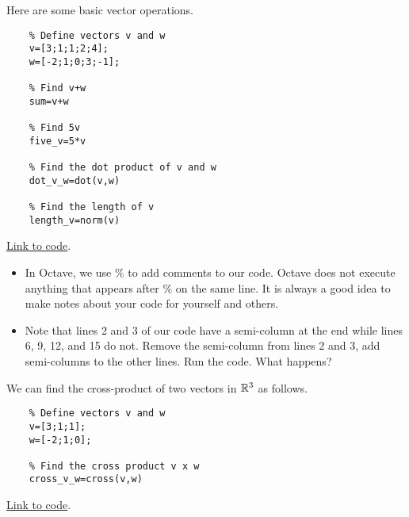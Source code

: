 \documentclass{ximera}
\begin{document}
\begin{template}\label{temp:vectorOps}
Here are some basic vector operations.
\begin{verbatim}
    % Define vectors v and w
    v=[3;1;1;2;4];
    w=[-2;1;0;3;-1]; 

    % Find v+w  
    sum=v+w

    % Find 5v
    five_v=5*v

    % Find the dot product of v and w
    dot_v_w=dot(v,w)

    % Find the length of v
    length_v=norm(v)
\end{verbatim}

\href{https://sagecell.sagemath.org/?z=eJxdTUEKwjAQvAfyh70UWrVgW3sKuYmfKBKkSWzAJpKmm--76sEie9idmZ2ZAs7GOm8AzZhCXADh5jVkzlAOnWhoWnG6Cs6yHOqW4FF0om7eDGcFXBx94z4DcLass6RzI_TImXVoFMp-hxshTQZ0SPCMQa9jgmB_xcQrVFnSLvGQqz_bw_h7mj4Ozr6A4n2Ic4nVCwQtO2M=&lang=octave&interacts=eJyLjgUAARUAuQ==}{Link to code}.

\begin{remark}
    \begin{itemize}
        \item In Octave, we use $\%$ to add comments to our code. Octave does not execute anything that appears after $\%$ on the same line. It is always a good idea to make notes about your code for yourself and others. 
        \item Note that lines 2 and 3 of our code have a semi-column at the end while lines 6, 9, 12, and 15 do not.  Remove the semi-column from lines 2 and 3, add semi-columns to the other lines.  Run the code.  What happens?
    \end{itemize}
\end{remark}
\end{template}

\begin{template}\label{temp_oct_vec_cross}
We can find the cross-product of two vectors in $\mathbb{R}^3$ as follows.

\begin{verbatim}
    % Define vectors v and w
    v=[3;1;1];
    w=[-2;1;0];
    
    % Find the cross product v x w
    cross_v_w=cross(v,w)
    \end{verbatim}
    
    \href{https://sagecell.sagemath.org/?z=eJxTVXBJTcvMS1UoS00uyS8qVihTSMxLUSjn5SqzjTa2NrQ2jLXm5Sq3jdY1AnIMQBxeLlUFt0ygopKMVIXkovziYoWCovyU0uQSoOYKkFawYHxZfLktmKVRplOuCQBmGSA1&lang=octave&interacts=eJyLjgUAARUAuQ==}{Link to code}.

\end{template}
\end{document}
